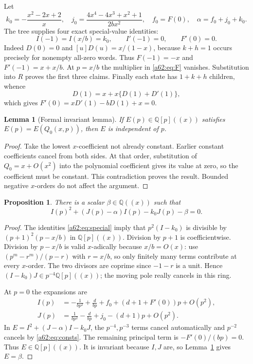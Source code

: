 \documentclass[11pt,letterpaper]{article}
\newtheorem{lemma}[theorem]{Lemma}
\newtheorem{proposition}[theorem]{Proposition}
\theoremstyle{remark}\newtheorem{remark}[theorem]{Remark}
\newcommand{\Q}{\mathbb Q}
\begin{document}
Let
\begin{equation}\label{a62:eq:consts}
 k_0=-\frac{x^2-2x+2}{x},\quad
 j_0=\frac{4x^4-4x^3+x^2+1}{2bx^2},\quad
 f_0=F(0),\quad \alpha=f_0+j_0+k_0.
\end{equation}
The tree supplies four exact special-value identities:
\begin{equation}\label{a62:eq:special}
 I(-1)=I(x/b)=k_0,\qquad I'(-1)=0,\qquad F'(0)=0.
\end{equation}
Indeed $D(0)=0$ and $[u]D(u)=x/(1-x)$, because $k+h=1$ occurs precisely for nonempty all-zero words. Thus $F(-1)=-x$ and $F'(-1)=x+x/b$. At $p=x/b$ the multiplier in \eqref{a62:eq:F} vanishes. Substitution into $R$ proves the first three claims. Finally each state has $1+k+h$ children, whence
\[
 D(1)=x+x\{D(1)+D'(1)\},
\]
which gives $F'(0)=xD'(1)-bD(1)+x=0$.

\begin{lemma}[Formal invariant lemma]\label{a62:lem:invariant}
If $E(p)\in\Q[p]((x))$ satisfies $E(p)=E(Q_0(x,p))$, then $E$ is independent of $p$.
\end{lemma}
\begin{proof}
Take the lowest $x$-coefficient not already constant. Earlier constant coefficients cancel from both sides. At that order, substitution of $Q_0=x+O(x^2)$ into the polynomial coefficient gives its value at zero, so the coefficient must be constant. This contradiction proves the result. Bounded negative $x$-orders do not affect the argument.
\end{proof}

\begin{proposition}\label{a62:prop:quadratic}
There is a scalar $\beta\in\Q((x))$ such that
\begin{equation}\label{a62:eq:quadratic}
 I(p)^2+(J(p)-\alpha)I(p)-k_0J(p)-\beta=0.
\end{equation}
\end{proposition}
\begin{proof}
The identities \eqref{a62:eq:special} imply that $p^2(I-k_0)$ is divisible by $(p+1)^2(p-x/b)$ in $\Q[p]((x))$. Division by $p+1$ is coefficientwise. Division by $p-x/b$ is valid $x$-adically because $x/b=O(x)$: use $(p^m-r^m)/(p-r)$ with $r=x/b$, so only finitely many terms contribute at every $x$-order. The two divisors are coprime since $-1-r$ is a unit. Hence $(I-k_0)J\in p^{-4}\Q[p]((x))$; the moving pole really cancels in this ring.

At $p=0$ the expansions are
\begin{align*}
 I(p)&=-\frac1{bp^2}+\frac d{bp}+f_0+(d+1+F'(0))p+O(p^2),\\
 J(p)&=\frac1{bp^2}-\frac d{bp}+j_0-(d+1)p+O(p^2).
\end{align*}
In $E=I^2+(J-\alpha)I-k_0J$, the $p^{-4},p^{-3}$ terms cancel automatically and $p^{-2}$ cancels by \eqref{a62:eq:consts}. The remaining principal term is $-F'(0)/(bp)=0$. Thus $E\in\Q[p]((x))$. It is invariant because $I,J$ are, so Lemma~\ref{a62:lem:invariant} gives $E=\beta$.
\end{proof}
\end{document}
